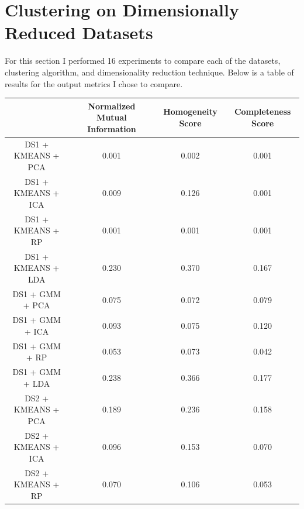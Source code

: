 \documentclass[11pt]{article}
\begin{document}
    \section{Clustering on Dimensionally Reduced Datasets}\label{sec:clustering-on-dimensionally-reduced-datasets}
    For this section I performed 16 experiments to compare each of the datasets, clustering algorithm, and dimensionality
    reduction technique.
    Below is a table of results for the output metrics I chose to compare.
    \begin{center}
        \begin{tabular}{|c| c | c | c |}
            \hline
            & Normalized Mutual Information & Homogeneity Score & Completeness Score \\
            \hline
            \hline
            DS1 + KMEANS + PCA & 0.001                         & 0.002             & 0.001              \\
            \hline
            DS1 + KMEANS + ICA & 0.009                         & 0.126             & 0.001              \\
            \hline
            DS1 + KMEANS + RP  & 0.001                         & 0.001             & 0.001              \\
            \hline
            DS1 + KMEANS + LDA & 0.230                         & 0.370             & 0.167              \\
            \hline
            DS1 + GMM + PCA    & 0.075                         & 0.072             & 0.079              \\
            \hline
            DS1 + GMM + ICA    & 0.093                         & 0.075             & 0.120              \\
            \hline
            DS1 + GMM + RP     & 0.053                         & 0.073             & 0.042              \\
            \hline
            DS1 + GMM + LDA    & 0.238                         & 0.366             & 0.177              \\
            \hline
            DS2 + KMEANS + PCA & 0.189                         & 0.236             & 0.158              \\
            \hline
            DS2 + KMEANS + ICA & 0.096                         & 0.153             & 0.070              \\
            \hline
            DS2 + KMEANS + RP  & 0.070                         & 0.106             & 0.053              \\

\end{tabular}
\end{center}
\end{document}
